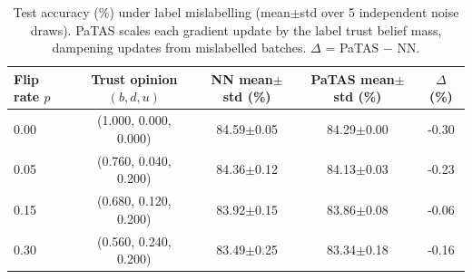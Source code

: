 \begin{table}[ht]
\centering
\caption{Test accuracy (\%) under label mislabelling (mean$\pm$std over 5 independent noise draws). PaTAS scales each gradient update by the label trust belief mass, dampening updates from mislabelled batches. $\Delta$ = PaTAS $-$ NN.}
\label{tab:label-noise}
\begin{tabular}{lcccc}
\toprule
Flip rate $p$ & Trust opinion $(b,d,u)$ & NN mean$\pm$std (\%) & PaTAS mean$\pm$std (\%) & $\Delta$ (\%) \\
\midrule
0.00 & (1.000, 0.000, 0.000) & 84.59$\pm$0.05 & 84.29$\pm$0.00 & -0.30 \\
0.05 & (0.760, 0.040, 0.200) & 84.36$\pm$0.12 & 84.13$\pm$0.03 & -0.23 \\
0.15 & (0.680, 0.120, 0.200) & 83.92$\pm$0.15 & 83.86$\pm$0.08 & -0.06 \\
0.30 & (0.560, 0.240, 0.200) & 83.49$\pm$0.25 & 83.34$\pm$0.18 & -0.16 \\
\bottomrule
\end{tabular}
\end{table}